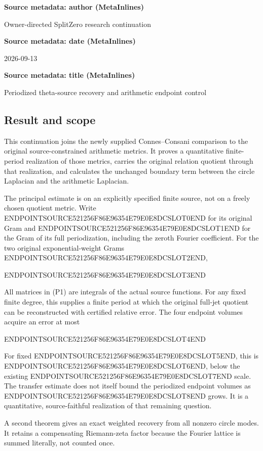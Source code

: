 \textbf{Source metadata: author (MetaInlines)}

Owner-directed SplitZero research continuation

\textbf{Source metadata: date (MetaInlines)}

2026-09-13

\textbf{Source metadata: title (MetaInlines)}

Periodized theta-source recovery and arithmetic endpoint control

\subsection{Result and scope}\label{endpoint-periodized_original--result-and-scope}

This continuation joins the newly supplied Connes--Consani comparison to the original source-constrained arithmetic metrics. It proves a quantitative finite-period realization of those metrics, carries the original relation quotient through that realization, and calculates the unchanged boundary term between the circle Laplacian and the arithmetic Laplacian.

The principal estimate is on an explicitly specified finite source, not on a freely chosen quotient metric. Write ENDPOINTSOURCE521256F86E96354E79E0E8DCSLOT0END for its original Gram and ENDPOINTSOURCE521256F86E96354E79E0E8DCSLOT1END for the Gram of its full periodization, including the zeroth Fourier coefficient. For the two original exponential-weight Grams ENDPOINTSOURCE521256F86E96354E79E0E8DCSLOT2END,

ENDPOINTSOURCE521256F86E96354E79E0E8DCSLOT3END

All matrices in (P1) are integrals of the actual source functions. For any fixed finite degree, this supplies a finite period at which the original full-jet quotient can be reconstructed with certified relative error. The four endpoint volumes acquire an error at most

ENDPOINTSOURCE521256F86E96354E79E0E8DCSLOT4END

For fixed ENDPOINTSOURCE521256F86E96354E79E0E8DCSLOT5END, this is ENDPOINTSOURCE521256F86E96354E79E0E8DCSLOT6END, below the existing ENDPOINTSOURCE521256F86E96354E79E0E8DCSLOT7END scale. The transfer estimate does not itself bound the periodized endpoint volumes as ENDPOINTSOURCE521256F86E96354E79E0E8DCSLOT8END grows. It is a quantitative, source-faithful realization of that remaining question.

A second theorem gives an exact weighted recovery from all nonzero circle modes. It retains a compensating Riemann-zeta factor because the Fourier lattice is summed literally, not counted once.

